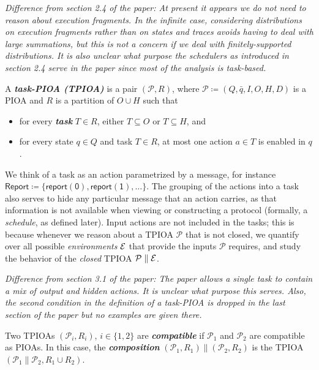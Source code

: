 \documentclass[10pt]{article}
\begin{document}
{\small \em Difference from section 2.4 of the paper: At present it appears we do not need to reason about execution fragments. In the infinite case, considering distributions on execution fragments rather than on states and traces avoids having to deal with large summations, but this is not a concern if we deal with finitely-supported distributions. It is also unclear what purpose the schedulers as introduced in section 2.4 serve in the paper since most of the analysis is task-based.}

\begin{definition}
A \textbf{\emph{task-PIOA (TPIOA)}} is a pair $(\mathcal{P},R)$, where $\mathcal{P} \coloneqq (Q,\bar{q},I,O,H,D)$ is a PIOA and $R$ is a partition of $O \cup H$ such that 
\begin{itemize}
\item for every \emph{\textbf{task}} $T \in R$, either $T \subseteq O$ or $T \subseteq H$, and
\item for every state $q \in Q$ and task $T \in R$, at most one action $a \in T$ is enabled in $q$.
\end{itemize}
\end{definition}

We think of a task as an action parametrized by a message, for instance $\mathsf{Report} \coloneqq \{\mathsf{report(0)},\mathsf{report(1)}, \ldots\}$. The grouping of the actions into a task also serves to hide any particular message that an action carries, as that information is not available when viewing or constructing a protocol (formally, a \emph{schedule}, as defined later). Input actions are not included in the tasks; this is because whenever we reason about a TPIOA $\mathcal{P}$ that is not closed, we quantify over all possible \emph{environments} $\mathcal{E}$ that provide the inputs $\mathcal{P}$ requires, and study the behavior of the \emph{closed} TPIOA $\mathcal{P} \parallel \mathcal{E}$. \medskip

{\small \em Difference from section 3.1 of the paper: The paper allows a single task to contain a mix of output and hidden actions. It is unclear what purpose this serves. Also, the second condition in the definition of a task-PIOA is dropped in the last section of the paper but no examples are given there.}

\begin{definition}
Two TPIOAs $(\mathcal{P}_i,R_i)$, $i \in \{1,2\}$ are \emph{\textbf{compatible}} if $\mathcal{P}_1$ and $\mathcal{P}_2$ are compatible as PIOAs. In this case, the \textbf{\emph{composition}} $(\mathcal{P}_1,R_1) \parallel (\mathcal{P}_2,R_2)$ is the TPIOA $(\mathcal{P}_1 \parallel \mathcal{P}_2, R_1 \cup R_2)$.
\end{definition}
\end{document}
